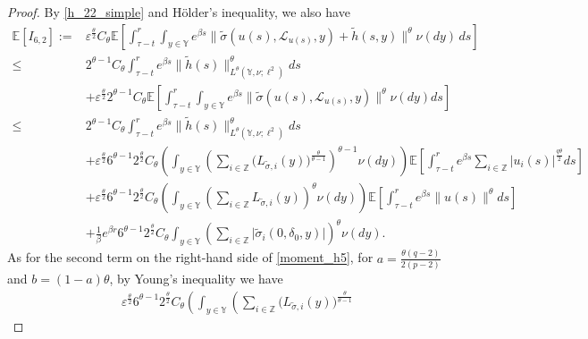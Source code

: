 \documentclass[11pt]{article}
\numberwithin{equation}{section}
\theoremstyle{plain}
\begin{document}
\begin{proof}
By \eqref{h_22_simple} and Hölder's inequality, we  also have
\begin{align}\label{moment_h5}
	\mathbb{E}[I_{6,2}]
	:= &
	\varepsilon^{\frac{\theta}{2}} C_\theta
	\mathbb{E}\left[ 
	\int_{\tau-t}^{r}
	\int_{
	y\in\mathbb{Y}
	}
	e^{\beta s}
	\big\|
	\widetilde{\sigma}(u(s), \mathcal{L}_{u(s)}, y)
	+ \widetilde{h}(s,y)
	\big\|^\theta
	\nu(dy) \, ds
	\right] \nonumber\\
	\le &
	2^{\theta-1} C_{\theta}
	\int_{\tau-t}^{r}
	e^{\beta s} 
	\|\widetilde{h}(s)\|^{\theta}_{L^{\theta}(\mathbb{Y}, \nu; \ell^2)} ds
	 \nonumber\\
	& + \varepsilon^{\frac{\theta}{2}}
	2^{\theta-1} C_{\theta} 
	\mathbb{E}\left[
	\int_{\tau-t}^{r} 
	\int_{y \in \mathbb{Y} }
	e^{\beta s}
	\big\|
	\widetilde{\sigma}(u(s), \mathcal{L}_{u(s)}, y)
	\big\|^{\theta}
	\nu (dy) ds
	\right] \nonumber\\
	\le &
	2^{\theta-1} C_{\theta}
	\int_{\tau-t}^{r}
	e^{\beta s} 
	\|\widetilde{h}(s)\|^{\theta}_{L^{\theta}(\mathbb{Y}, \nu; \ell^2)} ds
	 \nonumber\\
	& + \varepsilon^{\frac{\theta}{2}}
	6^{\theta-1} 2^{\frac{\theta}{2}} C_{\theta}
	\left(
	  \int_{
	  	y\in\mathbb{Y}
	  }
	\left(
	\sum_{i \in \mathbb{Z}}
	\big( L_{\tilde{\sigma},i}(y) \big)^{\frac{\theta}{\theta-1}}
	\right)^{\theta-1}
	\nu(dy)
	\right)
	\mathbb{E}\left[
	\int_{\tau-t}^{r}
	e^{\beta s}
	\sum_{i \in \mathbb{Z}}
	|u_i(s)|^{\frac{q\theta}{2}} ds
	\right]  \nonumber\\
	& + \varepsilon^{\frac{\theta}{2}}
	6^{\theta-1} 2^{\frac{\theta}{2}} C_{\theta}
	\left(
	 \int_{y \in \mathbb{Y} }
	\left(
	\sum_{i \in \mathbb{Z}}
	L_{\tilde{\sigma}, i}(y)
	\right)^{\theta}
	\nu(dy)
	\right)
	\mathbb{E}\left[
	\int_{\tau-t}^{r}
	e^{\beta s} \|u(s)\|^{\theta} ds
	\right]  \nonumber\\
	& + \frac{1}{\beta} e^{\beta r}
	6^{\theta-1} 2^{\frac{\theta}{2}} C_{\theta}
	  \int_{y \in \mathbb{Y} }
	\left( \sum_{i \in \mathbb{Z} }
	\big|\widetilde{\sigma}_{i}(0,\delta_0,y)\big|
	\right)^{\theta}
	\nu(dy) .
\end{align}
As for the second term on the right-hand side of \eqref{moment_h5}, 
for $a = \tfrac{\theta(q-2)}{2(p-2)}$ and $b = (1-a) \theta$,
by Young's inequality we have 
\begin{align}\label{moment_h6}
	& \varepsilon^{\frac{\theta}{2}}
	6^{\theta-1} 2^{\frac{\theta}{2}} C_{\theta}
	\left(
	  \int_{
	  y\in\mathbb{Y}
	  }
	\left(
	\sum_{i \in \mathbb{Z}}
	\big( L_{\tilde{\sigma},i}(y)
	\big)^{\frac{\theta}{\theta-1}}

\end{align}
\end{proof}
\end{document}
